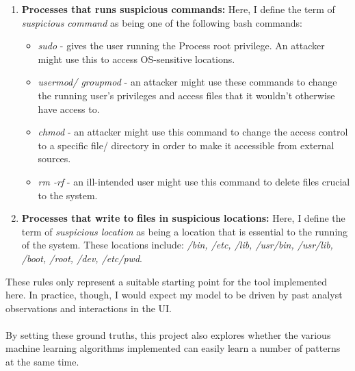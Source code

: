 \begin{enumerate}
		\item \textbf{Processes that runs suspicious commands: }Here, I define the term of \textit{suspicious command} as being one of the following bash commands:
		\begin{itemize}
			\item \textit{sudo} - gives the user running the Process root privilege. An attacker might use this to access OS-sensitive locations. 
			\item \textit{usermod/ groupmod} - an attacker might use these commands to change the running user's privileges and access files that it wouldn't otherwise have access to.
			\item \textit{chmod} - an attacker might use this command to change the access control to a specific file/ directory in order to make it accessible from external sources.
			\item \textit{rm -rf} - an ill-intended user might use this command to delete files crucial to the system. 
		\end{itemize}
	
		\item \textbf{Processes that write to files in suspicious locations: }Here, I define the term of \textit{suspicious location} as being a location that is essential to the running of the system. These locations include:  \textit{/bin, /etc, /lib, /usr/bin, /usr/lib, /boot, /root, /dev, /etc/pwd}.
	\end{enumerate}
	These rules only represent a suitable starting point for the tool implemented here. In practice, though, I would expect my model to be driven by past analyst observations and interactions in the UI. 
	\\ \\
	By setting these ground truths, this project also explores whether the various machine learning algorithms implemented can easily learn a number of patterns at the same time.
